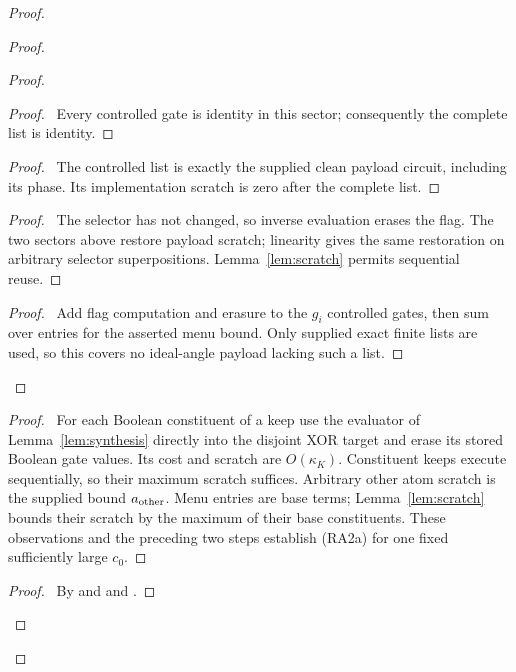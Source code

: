 \begin{proof}
\begin{proof}
\begin{proof}
{ }
 \begin{proof}\pf\ Every controlled gate is identity in this
 sector; consequently the complete list is identity.\end{proof}
 \begin{proof}\pf\ The controlled list is exactly the supplied
 clean payload circuit, including its phase. Its implementation
 scratch is zero after the complete list.\end{proof}
 \begin{proof}\pf\ The selector has not changed, so inverse
 evaluation erases the flag. The two sectors above restore payload
 scratch; linearity gives the same restoration on arbitrary selector
 superpositions. Lemma~\ref{lem:scratch} permits sequential reuse.
 \end{proof}
 \qedstep
 \begin{proof}\pf\ Add flag computation and erasure to the $g_i$
 controlled gates, then sum over entries for the asserted menu bound.
 Only supplied exact finite lists are used, so this covers no
 ideal-angle payload lacking such a list.\end{proof}
\end{proof}
  \begin{proof}\pf\ For each Boolean constituent of a keep use the
  evaluator of Lemma~\ref{lem:synthesis} directly into the disjoint
  XOR target and erase its stored Boolean gate values. Its cost and
  scratch are $O(\kappa_K)$. Constituent keeps execute sequentially,
  so their maximum scratch suffices. Arbitrary other atom scratch is
  the supplied bound $a_{\rm other}$. Menu entries are base terms;
  Lemma~\ref{lem:scratch} bounds their scratch by the maximum of
  their base constituents. These observations and the preceding two
  steps establish (RA2a) for one fixed sufficiently large $c_0$.
  \end{proof}
  \qedstep
  \begin{proof}\pf\ By  and
   and .\end{proof}
 \end{proof}

\end{proof}
